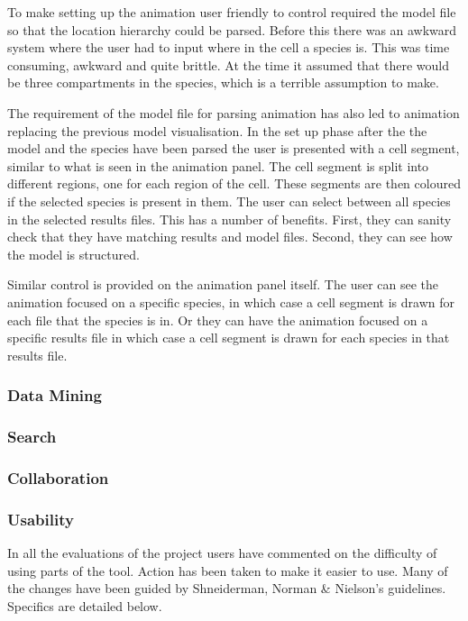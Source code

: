 To make setting up the animation user friendly to control required the model file so that the location hierarchy could be parsed.  Before this there was an awkward system where the user had to input where in the cell a species is.  This was time consuming, awkward and quite brittle.  At the time it assumed that there would be three compartments in the species, which is a terrible assumption to make.

The requirement of the model file for parsing animation has also led to animation replacing the previous model visualisation.  In the set up phase after the the model and the species have been parsed the user is presented with a cell segment, similar to what is seen in the animation panel.  The cell segment is split into different regions, one for each region of the cell.  These segments are then coloured if the selected species is present in them.  The user can select between all species in the selected results files.  This has a number of benefits.  First, they can sanity check that they have matching results and model files.  Second, they can see how the model is structured.

Similar control is provided on the animation panel itself.  The user can see the animation focused on a specific species, in which case a cell segment is drawn for each file that the species is in.  Or they can have the animation focused on a specific results file in which case a cell segment is drawn for each species in that results file.

\subsubsection{Data Mining}

\subsubsection{Search}

\subsubsection{Collaboration}

\subsubsection{Usability}

In all the evaluations of the project users have commented on the difficulty of using parts of the tool.  Action has been taken to make it easier to use.  Many of the changes have been guided by Shneiderman, Norman \& Nielson's guidelines.  Specifics are detailed below.

